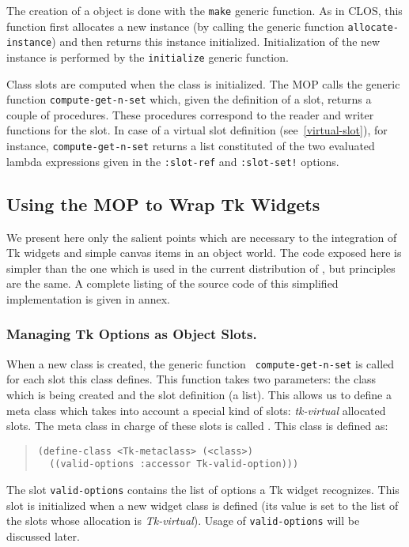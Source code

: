 {The creation of a {\stklos} object is done with the {\tt make} generic
function. As in CLOS, this function first allocates a new instance
(by calling the generic function {\tt allocate-instance})
and then returns this instance initialized. Initialization of the
new instance is performed by the {\tt initialize} generic function. 

Class slots are computed when the class is initialized. The {\stklos}
MOP calls the generic function {\tt compute-get-n-set} which, given
the definition of a slot, returns a couple of procedures. These
procedures correspond to the reader and writer functions for the
slot. In case of a virtual slot definition (see~\ref{virtual-slot}),
for instance, {\tt compute-get-n-set} returns a list constituted of
the two evaluated lambda expressions given in the {\tt :slot-ref}
and {\tt :slot-set!} options.

\subsection{Using the MOP to Wrap Tk Widgets}

We present here only the salient points which are necessary to the
integration of Tk widgets and simple canvas items in an object
world. The code exposed here is simpler than the one which is used in
the current distribution of {\stk}, but principles are the same. A
complete listing of the source code of this simplified implementation
is given in annex.

\subsubsection{Managing Tk Options as Object Slots.} 

When a new class is created, the generic function {\tt
compute-get-n-set} is called for each slot this class defines. This
function takes two parameters: the class which is being created and
the slot definition (a list). This allows us to define a meta class
which takes into account a special kind of slots: {\em tk-virtual}
allocated slots. The meta class in charge of these slots is called
{\tt <Tk-metaclass>}. This class is defined as:
\begin{quote}\figsize
\begin{verbatim}
(define-class <Tk-metaclass> (<class>)
  ((valid-options :accessor Tk-valid-option)))
\end{verbatim}
\end{quote}
The slot {\tt valid-options} contains the list of options a Tk widget
recognizes. This slot is initialized when a new widget class is defined
(its value is set to the list of the slots whose allocation is {\em
Tk-virtual}). Usage of {\tt valid-options} will be discussed later.

}
